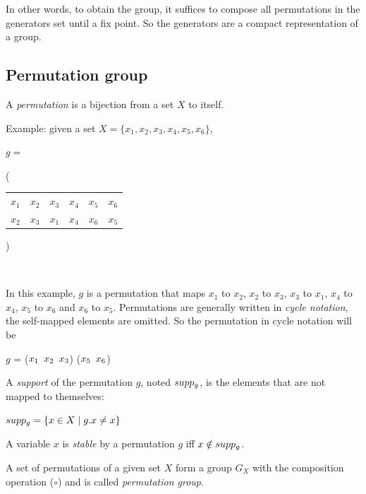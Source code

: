 In other words, to obtain the group, it suffices to compose all permutations in the generators set until a fix point.
So the generators are a compact representation of a group.

\subsection{Permutation group}

\begin{definition}[Permutation]
	A \emph{permutation} is a bijection from a set $X$ to itself.
\end{definition}

Example: given a set $X = \{x_1, x_2, x_3, x_4, x_5, x_6\}$,
\begin{center}
$g = ${\Bigg( \begin{tabular}{cccccc}
  $x_1$ & $x_2$ & $x_3$ & $x_4$ & $x_5$ & $x_6$\\
  $x_2$ & $x_3$ & $x_1$ & $x_4$ & $x_6$ & $x_5$
 \end{tabular} \Bigg)}\\
\end{center}
In this example, $g$ is a permutation that maps $x_1$ to $x_2$, $x_2$ to $x_3$, $x_3$ to $x_1$, $x_4$ to $x_4$, $x_5$ to $x_6$ and $x_6$ to $x_5$.
Permutations are generally written in \emph{cycle notation}, the self-mapped elements are omitted.
So the permutation in cycle notation will be 
\begin{center}
 $g$ = ($x_1 \enskip x_2 \enskip x_3$) ($x_5 \enskip x_6$)
\end{center}

\begin{definition}
	A \emph{support} of the permutation $g$, noted $supp_{g}$, is the elements that are not mapped to themselves:
	\begin{center}
		$supp_{g} = \{ x \in X \mid g.x \neq x\}$
	\end{center}
\end{definition}


\begin{definition}
	A variable $x$ is \emph{stable} by a permutation $g$  iff $x \notin supp_g$.
\end{definition}
	

\begin{definition}
	A set of permutations of a given set $X$ form a group $G_X$ with the composition operation ($\circ$) and is called \emph{permutation group}.
\end{definition}

